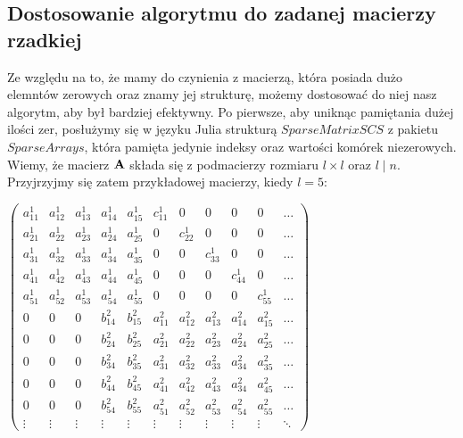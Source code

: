 \documentclass{article}
\begin{document}
\subsection{Dostosowanie algorytmu do zadanej macierzy rzadkiej}
Ze względu na to, że mamy do czynienia z macierzą, która posiada dużo elemntów zerowych oraz znamy jej strukturę, możemy dostosować do niej nasz algorytm, aby był bardziej efektywny. Po pierwsze, aby uniknąc pamiętania dużej ilości zer, posłużymy się w języku Julia strukturą $SparseMatrixSCS$ z pakietu $SparseArrays$, która pamięta jedynie indeksy oraz wartości komórek niezerowych. Wiemy, że macierz $\bold{A}$ składa się z podmacierzy rozmiaru $l \times l$ oraz $l \mid n$. Przyjrzyjmy się zatem przykładowej macierzy, kiedy $l = 5$:
\setcounter{MaxMatrixCols}{11}
\begin{center}
$
    \begin{pmatrix}
        a_{11}^{1} & a_{12}^{1} & a_{13}^{1} & a_{14}^{1} & a_{15}^{1} & c_{11}^{1} & 0 & 0 &  0 & 0  & \ldots \\
        a_{21}^{1} & a_{22}^{1} & a_{23}^{1} & a_{24}^{1} & a_{25}^{1} & 0 & c_{22}^{1} & 0 & 0 & 0 & \ldots \\
        a_{31}^{1} & a_{32}^{1} & a_{33}^{1} & a_{34}^{1} & a_{35}^{1} & 0 & 0 & c_{33}^{1} & 0 & 0  & \ldots \\
        a_{41}^{1} & a_{42}^{1} & a_{43}^{1} & a_{44}^{1} & a_{45}^{1} & 0 & 0 & 0 & c_{44}^{1} & 0  &\ldots \\
        a_{51}^{1} & a_{52}^{1} & a_{53}^{1} & a_{54}^{1} & a_{55}^{1} & 0 & 0 & 0 & 0 & c_{55}^{1} & \ldots \\
        0 & 0 & 0 & b_{14}^{2} & b_{15}^{2} & a_{11}^{2} & a_{12}^{2} & a_{13}^{2} & a_{14}^{2} & a_{15}^{2} &  \ldots \\
        0 & 0 & 0 & b_{24}^{2} & b_{25}^{2} & a_{21}^{2} & a_{22}^{2} & a_{23}^{2} & a_{24}^{2} & a_{25}^{2} & \ldots \\
        0 & 0 & 0 & b_{34}^{2} & b_{35}^{2} & a_{31}^{2} & a_{32}^{2} & a_{33}^{2} & a_{34}^{2} & a_{35}^{2} & \ldots \\
        0 & 0 & 0 & b_{44}^{2} & b_{45}^{2} & a_{41}^{2} & a_{42}^{2} & a_{43}^{2} & a_{34}^{2} & a_{45}^{2} & \ldots \\
        0 & 0 & 0 & b_{54}^{2} & b_{55}^{2} & a_{51}^{2} & a_{52}^{2} & a_{53}^{2} & a_{54}^{2} & a_{55}^{2} & \ldots \\
        \vdots & \vdots & \vdots & \vdots & \vdots & \vdots & \vdots & \vdots & \vdots & \vdots & \ddots
    \end{pmatrix}
    $
\end{center}
\end{document}
